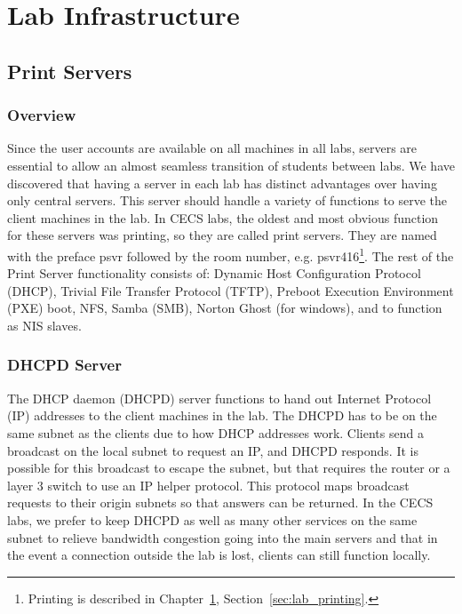 \chapter{Lab Infrastructure} \label{ch:lab_infrastructure}
\section{Print Servers} \label{sec:printservers}
\subsection{Overview}

Since the user accounts are available on all machines in all labs, servers are essential to allow an almost seamless transition of students between labs.  We have discovered that having a server in each lab has distinct advantages over having only central servers.  This server should handle a variety of functions to serve the client machines in the lab.  In CECS labs, the oldest and most obvious function for these servers was printing, so they are called print servers. They are named with the preface psvr followed by the room number, e.g. psvr416\footnote{Printing is described in Chapter~\ref{ch:lab_infrastructure}, Section~\ref{sec:lab_printing}.}.  The rest of the Print Server functionality consists of: Dynamic Host Configuration Protocol (DHCP), Trivial File Transfer Protocol (TFTP), Preboot Execution Environment (PXE) boot, NFS, Samba (SMB), Norton Ghost (for windows), and to function as NIS slaves.  

\subsection{DHCPD Server}

The DHCP daemon (DHCPD) server functions to hand out Internet Protocol (IP) addresses to the client machines in the lab.  The DHCPD has to be on the same subnet as the clients due to how DHCP addresses work.  Clients send a broadcast on the local subnet to request an IP, and DHCPD responds.  It is possible for this broadcast to escape the subnet, but that requires the router or a layer 3 switch to use an IP helper protocol.  This protocol maps broadcast requests to their origin subnets so that answers can be returned.  In the CECS labs, we prefer to keep DHCPD as well as many other services on the same subnet to relieve bandwidth congestion going into the main servers and that in the event a connection outside the lab is lost, clients can still function locally.  

